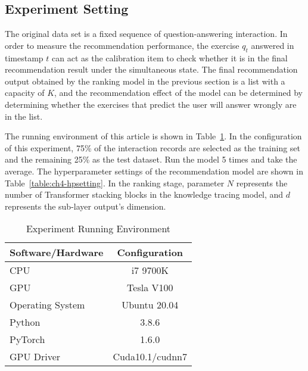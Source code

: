 \subsection{Experiment Setting}

The original data set is a fixed sequence of question-answering interaction. In order to measure the recommendation performance, the exercise \(q_t\) answered in timestamp \(t\) can act as the calibration item to check whether it is in the final recommendation result under the simultaneous state. The final recommendation output obtained by the ranking model in the previous section is a list with a capacity of \(K\), and the recommendation effect of the model can be determined by determining whether the exercises that predict the user will answer wrongly are in the list.


The running environment of this article is shown in Table~\ref{table:ch4-exp-env}. In the configuration of this experiment, 75\% of the interaction records are selected as the training set and the remaining 25\% as the test dataset. Run the model 5 times and take the average. The hyperparameter settings of the recommendation model are shown in Table~\ref{table:ch4-hpsetting}. In the ranking stage, parameter \(N\) represents the number of Transformer stacking blocks in the knowledge tracing model, and \(d\) represents the sub-layer output's dimension.

\begin{table}[htbp]
  \caption{Experiment Running Environment}\label{table:ch4-exp-env}
  \centering
  \begin{tabular}{l c}
    \toprule
    Software/Hardware & Configuration   \\
    \midrule
    CPU               & i7 9700K        \\

    GPU               & Tesla V100      \\

    Operating System  & Ubuntu 20.04    \\

    Python            & 3.8.6           \\

    PyTorch           & 1.6.0           \\

    GPU Driver        & Cuda10.1/cudnn7 \\
    \bottomrule
  \end{tabular}
\end{table}

